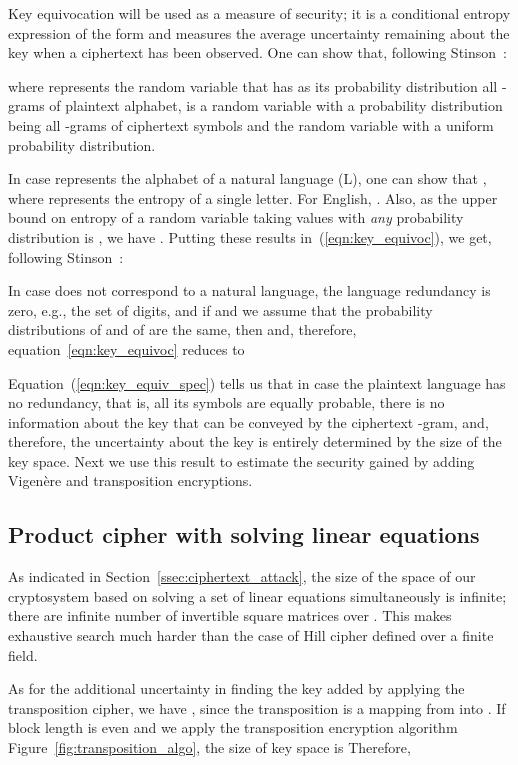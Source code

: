\documentclass[10pt,journal]{IEEEtran}
\begin{document}
Key equivocation will be used as a measure of security; it is a conditional 
entropy expression of the form  and measures the average 
uncertainty remaining about the key when a ciphertext has been 
observed. One can show that, following Stinson~\cite{stinson-2005}:


where  represents the random variable that has as its probability
distribution all -grams of plaintext alphabet,  is a random variable 
with a probability distribution being all -grams of ciphertext symbols and 
 the random variable with a uniform probability distribution. 
\newline

In case  represents the alphabet of a natural language (L),
one can show that , where  represents the 
entropy of a single letter. For English, . Also, as the upper bound on entropy  of a random variable  taking
 values  with \emph{any} probability
distribution  is , we have
. Putting these results
in~(\ref{eqn:key_equivoc}), we get, following Stinson~\cite{stinson-2005}:



In case  does not correspond to a natural language, 
the language redundancy is zero, e.g., the set of digits, and if 
 and we assume that the probability 
distributions of  and of  are the same, then 
 and, therefore, equation~\ref{eqn:key_equivoc} 
reduces to 


Equation~(\ref{eqn:key_equiv_spec}) tells us that in case the plaintext 
language has no redundancy, that is, all its symbols are equally probable, 
there is no information about the key that can be conveyed by the ciphertext 
-gram, and, therefore, the uncertainty about the key is entirely 
determined by the size of the key space. Next we use this result to estimate
the security gained by adding Vigen\`ere and transposition encryptions.

\subsection{Product cipher with solving linear equations}
As indicated in Section~\ref{ssec:ciphertext_attack}, the size of the 
space of our cryptosystem based on solving a set of linear equations 
simultaneously is infinite; there are infinite number of invertible square 
matrices over . This makes exhaustive search much 
harder than the case of Hill cipher defined over a finite field. 
\newline

As for the additional uncertainty in finding the key added by applying the 
transposition cipher, we have , since the 
transposition is a mapping from  into . 
If block length  is even and we apply the transposition encryption 
algorithm Figure~\ref{fig:transposition_algo}, the size of key space is 
 Therefore, 
 
\end{document}

